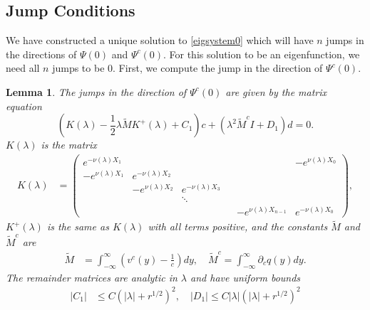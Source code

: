 \documentclass[10pt,reqno]{amsart}
\theoremstyle{plain}
\newtheorem{lemma}[theorem]{Lemma}
\theoremstyle{definition}
\theoremstyle{remark}
\numberwithin{theorem}{section}
\numberwithin{equation}{section}
\begin{document}
\subsection{Jump Conditions}

We have constructed a unique solution to \cref{eigsystem0} which will have $n$ jumps in the directions of $\Psi(0)$ and $\Psi^c(0)$. For this solution to be an eigenfunction, we need all $n$ jumps to be 0. First, we compute the jump in the direction of $\Psi^c(0)$. 

\begin{lemma}\label{jumpcenteradj}
The jumps in the direction of $\Psi^c(0)$ are given by the matrix equation
\begin{equation}\label{matrixjumpc}
\left( K(\lambda) - \frac{1}{2} \lambda \tilde{M} K^+(\lambda) + C_1 \right) c + \left(\lambda^2 \tilde{M}^c I + D_1\right) d = 0.
\end{equation}
$K(\lambda)$ is the matrix
\begin{align*}
K(\lambda) &=  
\begin{pmatrix}
e^{-\nu(\lambda)X_1} & & & & & -e^{\nu(\lambda)X_0} \\
-e^{\nu(\lambda)X_1} & e^{-\nu(\lambda)X_2} \\
& -e^{\nu(\lambda)X_2} & e^{-\nu(\lambda)X_3} \\
  & & \ddots & && \\
& & & & -e^{\nu(\lambda)X_{n-1}} & e^{-\nu(\lambda)X_0}
\end{pmatrix},
\end{align*}
$K^+(\lambda)$ is the same as $K(\lambda)$ with all terms positive, and the constants $\tilde{M}$ and $\tilde{M}^c$ are
\begin{align*}
\tilde{M} &= \int_{-\infty}^{\infty} \left(v^c(y) - \frac{1}{c}\right) dy, \quad
\tilde{M}^c = \int_{-\infty}^\infty \partial_c q(y) dy.
\end{align*}
The remainder matrices are analytic in $\lambda$ and have uniform bounds
\begin{align}\label{centerjumprem}
|C_1| &\leq C (|\lambda| + r^{1/2})^2, \quad
|D_1| \leq C |\lambda|(|\lambda| + r^{1/2})^2
\end{align}


\end{lemma}
\end{document}
